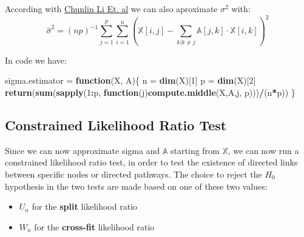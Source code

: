 \documentclass[
]{article}
\newenvironment{Shaded}{\begin{snugshade}}{\end{snugshade}}
\newcommand{\ControlFlowTok}[1]{\textcolor[rgb]{0.13,0.29,0.53}{\textbf{#1}}}
\newcommand{\DecValTok}[1]{\textcolor[rgb]{0.00,0.00,0.81}{#1}}
\newcommand{\KeywordTok}[1]{\textcolor[rgb]{0.13,0.29,0.53}{\textbf{#1}}}
\newcommand{\NormalTok}[1]{#1}
\newcommand{\OperatorTok}[1]{\textcolor[rgb]{0.81,0.36,0.00}{\textbf{#1}}}
\newcommand{\StringTok}[1]{\textcolor[rgb]{0.31,0.60,0.02}{#1}}
\providecommand{\tightlist}{%
  \setlength{\itemsep}{0pt}\setlength{\parskip}{0pt}}
\begin{document}
According with
\href{https://elearning.uniroma1.it/pluginfile.php/1112893/mod_assign/introattachment/0/Likelihood\%20Ratio\%20Tests\%20for\%20a\%20Large\%20Directed\%20Acyclic\%20Graph.pdf?forcedownload=1}{Chunlin
Li Et. al} we can also aproximate \(\sigma^2\) with: \begin{equation}
  \hat{\sigma}^2 = (np)^{-1} \sum_{j=1}^p \sum_{i=1}^n\left ( \mathbb{X}[i,j] - \sum_{k | k\neq j} \mathbb{A}[j,k]\cdot \mathbb{X}[i,k] \right ) ^2
\end{equation}

In code we have:

\begin{Shaded}
\begin{Highlighting}[]
\NormalTok{sigma.estimator =}\StringTok{ }\ControlFlowTok{function}\NormalTok{(X, A)\{}
\NormalTok{  n =}\StringTok{ }\KeywordTok{dim}\NormalTok{(X)[}\DecValTok{1}\NormalTok{]}
\NormalTok{  p =}\StringTok{ }\KeywordTok{dim}\NormalTok{(X)[}\DecValTok{2}\NormalTok{]}
  \KeywordTok{return}\NormalTok{(}\KeywordTok{sum}\NormalTok{(}\KeywordTok{sapply}\NormalTok{(}\DecValTok{1}\OperatorTok{:}\NormalTok{p, }\ControlFlowTok{function}\NormalTok{(j)}\KeywordTok{compute.middle}\NormalTok{(X,A,j, p)))}\OperatorTok{/}\NormalTok{(n}\OperatorTok{*}\NormalTok{p))}
\NormalTok{\}}
\end{Highlighting}
\end{Shaded}

\hypertarget{constrained-likelihood-ratio-test}{%
\subsection{Constrained Likelihood Ratio
Test}\label{constrained-likelihood-ratio-test}}

Since we can now approximate sigma and \(\mathbb{A}\) starting from
\(\mathbb{X}\), we can now run a constrained likelihood ratio test, in
order to test the existence of directed links between specific nodes or
directed pathways. The choice to reject the \(H_0\) hypothesis in the
two tests are made based on one of these two values:

\begin{itemize}
\tightlist
\item
  \(U_n\) for the \textbf{split} likelihood ratio
\item
  \(W_n\) for the \textbf{cross-fit} likelihood ratio
\end{itemize}
\end{document}
